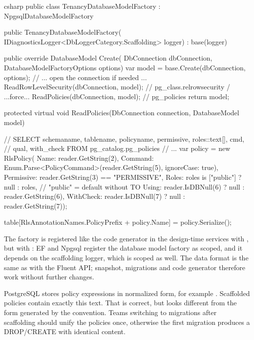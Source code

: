 \begin{sourcecode}{csharp}
public class TenancyDatabaseModelFactory : NpgsqlDatabaseModelFactory
{
    public TenancyDatabaseModelFactory(
        IDiagnosticsLogger<DbLoggerCategory.Scaffolding> logger)
        : base(logger)
    {
    }

    public override DatabaseModel Create(
        DbConnection dbConnection, DatabaseModelFactoryOptions options)
    {
        var model = base.Create(dbConnection, options);
        // ... open the connection if needed ...
        ReadRowLevelSecurity(dbConnection, model);    // pg_class.relrowsecurity / ...force...
        ReadPolicies(dbConnection, model);            // pg_policies
        return model;
    }

    protected virtual void ReadPolicies(DbConnection connection, DatabaseModel model)
    {
        // SELECT schemaname, tablename, policyname, permissive, roles::text[], cmd,
        //        qual, with_check FROM pg_catalog.pg_policies
        // ...
        var policy = new RlsPolicy(
            Name: reader.GetString(2),
            Command: Enum.Parse<PolicyCommand>(reader.GetString(5), ignoreCase: true),
            Permissive: reader.GetString(3) == "PERMISSIVE",
            Roles: roles is ["public"] ? null : roles,    // "public" = default without TO
            Using: reader.IsDBNull(6) ? null : reader.GetString(6),
            WithCheck: reader.IsDBNull(7) ? null : reader.GetString(7));

        table[RlsAnnotationNames.PolicyPrefix + policy.Name] = policy.Serialize();
    }
}
\end{sourcecode}

The factory is registered like the code generator in the design-time services with
, but with : EF and Npgsql
register the database model factory as scoped, and it depends on the scaffolding logger,
which is scoped as well. The data format is the same as with the Fluent API; snapshot, migrations and code generator therefore work without
further changes.

\begin{note}
  PostgreSQL stores policy expressions in normalized form, for example
  . Scaffolded policies contain exactly this text.
  That is correct, but looks different from the form generated by the convention. Teams
  switching to migrations after scaffolding should unify the policies once, otherwise the
  first migration produces a DROP/CREATE with identical content.
\end{note}


